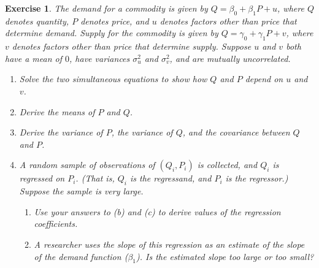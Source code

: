 \documentclass{article}
\newtheorem{exercise}[theorem]{Exercise}
\begin{document}
\begin{exercise}%
The demand for a commodity is given by $Q = \beta_0 + \beta_1P + u$, where $Q$ denotes quantity, $P$ denotes price, and $u$ denotes factors other than price that determine demand. Supply for the commodity is given by $Q = \gamma_0 + \gamma_1P + v$, where $v$ denotes factors other than price that determine supply. Suppose $u$ and $v$ both have a mean of $0$, have variances $\sigma_u^2$ and $\sigma_v^2$, and are mutually uncorrelated.
    \begin{enumerate}[label=\alph*)]
        \item Solve the two simultaneous equations to show how $Q$ and $P$ depend on $u$ and $v$.
        \item Derive the means of $P$ and $Q$.
        \item Derive the variance of $P$, the variance of $Q$, and the covariance between $Q$ and $P$.
        \item A random sample of observations of $(Q_i, P_i)$ is collected, and $Q_i$ is regressed on $P_i$. (That is, $Q_i$ is the regressand, and $P_i$ is the regressor.) Suppose the sample is very large.
        \begin{enumerate}[label=\roman* --]
            \item Use your answers to (b) and (c) to derive values of the regression coefficients.    
            \item A researcher uses the slope of this regression as an estimate of the slope of the demand function ($\beta_1$). Is the estimated slope too large or too small?
        \end{enumerate}
    \end{enumerate}
\end{exercise}
\vspace{.5cm}
\end{document}
